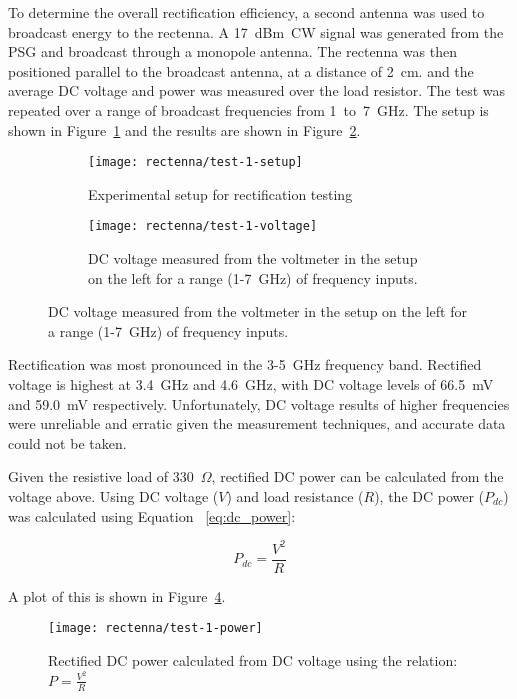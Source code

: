 To determine the overall rectification efficiency, a second antenna was used to broadcast energy to the rectenna. A 17~dBm~CW signal was generated from the PSG and broadcast through a monopole antenna. The rectenna was then positioned parallel to the broadcast antenna, at a distance of 2~cm. and the average DC voltage and power was measured over the load resistor. The test was repeated over a range of broadcast frequencies from 1~to~7~GHz. The setup is shown in Figure~\ref{fig:rectenna-test-1-setup} and the results are shown in Figure~\ref{fig:rectenna-test-1-voltage}.


\begin{figure}[h!]
    \centering
    \begin{subfigure}{.85\textwidth}
        \centering
        \texttt{[image: rectenna/test-1-setup]}
        \caption{Experimental setup for rectification testing}
        \label{fig:rectenna-test-1-setup}
    \end{subfigure}
    \begin{subfigure}{.85\textwidth}
        \centering
        \texttt{[image: rectenna/test-1-voltage]}
        \caption{DC voltage measured from the voltmeter in the setup on the left for a range (1-7~GHz) of frequency inputs.}
        \label{fig:rectenna-test-1-voltage}
    \end{subfigure}
    \label{fig:rectenna-test-1}
\end{figure}

Rectification was most pronounced in the 3-5~GHz frequency band. Rectified voltage is highest at 3.4~GHz and 4.6~GHz, with DC voltage levels of 66.5~mV and 59.0~mV respectively. Unfortunately, DC voltage results of higher frequencies were unreliable and erratic given the measurement techniques, and accurate data could not be taken.

Given the resistive load of 330~$\Omega$, rectified DC power can be calculated from the voltage above. Using DC voltage ($V$) and load resistance ($R$), the DC power ($P_{dc}$) was calculated using Equation ~\ref{eq:dc_power}:

\begin{equation}
P_{dc} = \frac{V^2}{R}
\label{eq:dc_power}
\end{equation}

A plot of this is shown in Figure~\ref{fig:rectenna-test-1-power}.

\begin{figure}[h!]
\centering
\texttt{[image: rectenna/test-1-power]}
    \caption[Rectified DC power]{Rectified DC power calculated from DC voltage using the relation: $P = \frac{V^2}{R}$}
    \label{fig:rectenna-test-1-power}
\end{figure}


